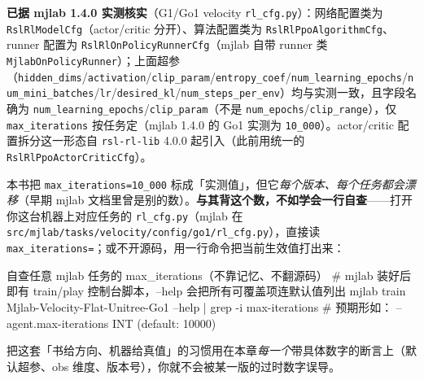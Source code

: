 \textbf{已据 mjlab 1.4.0 实测核实}（G1/Go1 velocity \texttt{rl\_cfg.py}）：网络配置类为 \texttt{RslRlModelCfg}（actor/critic 分开）、算法配置类为 \texttt{RslRlPpoAlgorithmCfg}、runner 配置为 \texttt{RslRlOnPolicyRunnerCfg}（mjlab 自带 runner 类 \texttt{MjlabOnPolicyRunner}）；上面超参（\texttt{hidden\_dims}/\texttt{activation}/\texttt{clip\_param}/\texttt{entropy\_coef}/\texttt{num\_learning\_epochs}/\texttt{num\_mini\_batches}/\texttt{lr}/\texttt{desired\_kl}/\texttt{num\_steps\_per\_env}）均与实测一致，且字段名确为 \texttt{num\_learning\_epochs}/\texttt{clip\_param}（不是 \texttt{num\_epochs}/\texttt{clip\_range}），仅 \texttt{max\_iterations} 按任务定（mjlab 1.4.0 的 Go1 实测为 \texttt{10\_000}）。actor/critic 配置拆分这一形态自 \texttt{rsl-rl-lib} 4.0.0 起引入（此前用统一的 \texttt{RslRlPpoActorCriticCfg}）。

\begin{insight}\label{ins:rlmc-mgr-recheck}
本书把 \texttt{max\_iterations=10\_000} 标成「实测值」，但它\emph{每个版本、每个任务都会漂移}（早期 mjlab 文档里曾是别的数）。\textbf{与其背这个数，不如学会一行自查}——打开你这台机器上对应任务的 \texttt{rl\_cfg.py}（mjlab 在 \texttt{src/mjlab/tasks/velocity/config/go1/rl\_cfg.py}），直接读 \texttt{max\_iterations=}；或不开源码，用一行命令把当前生效值打出来：
\begin{codebox}[bash]{自查任意 mjlab 任务的 max\_iterations（不靠记忆、不翻源码）}
# mjlab 装好后即有 train/play 控制台脚本，--help 会把所有可覆盖项连默认值列出
mjlab train Mjlab-Velocity-Flat-Unitree-Go1 --help | grep -i max-iterations
# 预期形如： --agent.max-iterations INT  (default: 10000)
\end{codebox}
\noindent 把这套「书给方向、机器给真值」的习惯用在本章\emph{每一个}带具体数字的断言上（默认超参、obs 维度、版本号），你就不会被某一版的过时数字误导。
\end{insight}

